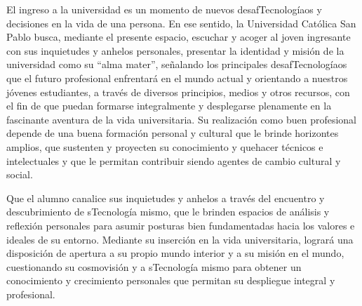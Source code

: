 \begin{syllabus}


\begin{justification}
El ingreso a la universidad es un momento de nuevos desafTecnologíaos y decisiones en la vida de una persona. En ese sentido, la Universidad Católica San Pablo busca, mediante el presente espacio, escuchar y acoger al joven ingresante con sus inquietudes y anhelos personales, presentar la identidad y misión de la universidad como su ``alma mater'', señalando los principales desafTecnologíaos que el futuro profesional enfrentará en el mundo actual  y orientando a nuestros jóvenes estudiantes, a través de diversos principios, medios y otros recursos, con el fin de que puedan formarse integralmente y desplegarse plenamente en la fascinante aventura de la vida universitaria.  Su realización como buen profesional depende de una buena formación personal y cultural que le brinde horizontes amplios, que sustenten y proyecten su conocimiento y quehacer técnicos e intelectuales y que le permitan contribuir siendo agentes de cambio cultural y social.
\end{justification}

\begin{goals}
\item Que el alumno canalice sus inquietudes y anhelos a través del encuentro y descubrimiento de sTecnología mismo, que le brinden espacios de análisis y reflexión personales para asumir posturas bien fundamentadas hacia los valores e ideales de su entorno. Mediante su inserción en la vida universitaria, logrará una disposición de apertura a su propio mundo interior y a su misión en el mundo, cuestionando su cosmovisión y a sTecnología mismo para obtener un conocimiento y crecimiento personales que permitan su despliegue integral y profesional.
\end{goals}

\begin{outcomes}
    \item {}
    \item {}
    \item {}
    \item {}
\end{outcomes}
\begin{competences}
    \item {}
    \item {}
\end{competences}


\end{syllabus}
